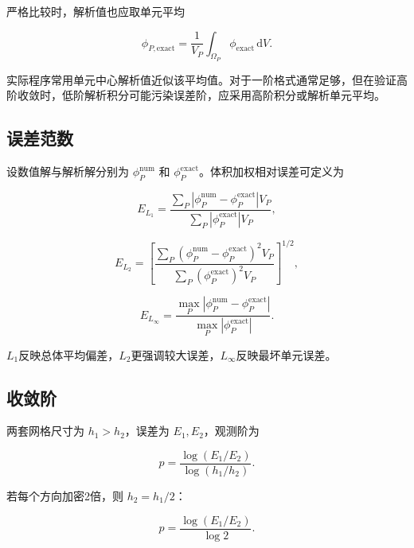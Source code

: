 \documentclass[UTF8,12pt,a4paper,fontset=fandol]{ctexart}
\numberwithin{equation}{section}
\newcommand{\dd}{\,\mathrm d}
\begin{document}
严格比较时，解析值也应取单元平均

\begin{equation}
  \phi_{P,\mathrm{exact}}
  =
  \frac1{V_P}
  \int_{\Omega_P}
  \phi_{\mathrm{exact}}\dd V.
\end{equation}

实际程序常用单元中心解析值近似该平均值。对于一阶格式通常足够，但在验证高阶收敛时，低阶解析积分可能污染误差阶，应采用高阶积分或解析单元平均。

\subsection{误差范数}

设数值解与解析解分别为 $\phi_P^{\mathrm{num}}$ 和 $\phi_P^{\mathrm{exact}}$。体积加权相对误差可定义为

\begin{equation}
  E_{L_1}
  =
  \frac{
  \sum_P
  |\phi_P^{\mathrm{num}}-\phi_P^{\mathrm{exact}}|V_P
  }{
  \sum_P
  |\phi_P^{\mathrm{exact}}|V_P
  },
\end{equation}

\begin{equation}
  E_{L_2}
  =
  \left[
  \frac{
  \sum_P
  (\phi_P^{\mathrm{num}}-\phi_P^{\mathrm{exact}})^2V_P
  }{
  \sum_P
  (\phi_P^{\mathrm{exact}})^2V_P
  }
  \right]^{1/2},
\end{equation}

\begin{equation}
  E_{L_\infty}
  =
  \frac{
  \max_P|\phi_P^{\mathrm{num}}-\phi_P^{\mathrm{exact}}|
  }{
  \max_P|\phi_P^{\mathrm{exact}}|
  }.
\end{equation}

$L_1$反映总体平均偏差，$L_2$更强调较大误差，$L_\infty$反映最坏单元误差。

\subsection{收敛阶}

两套网格尺寸为 $h_1>h_2$，误差为 $E_1,E_2$，观测阶为

\begin{equation}
  p
  =
  \frac{\log(E_1/E_2)}
  {\log(h_1/h_2)}.
\end{equation}

若每个方向加密2倍，则 $h_2=h_1/2$：

\begin{equation}
  p
  =
  \frac{\log(E_1/E_2)}{\log2}.
\end{equation}
\end{document}
